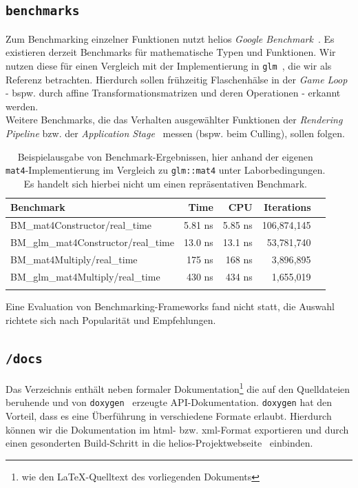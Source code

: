 \subsection*{\texttt{benchmarks}}
\noindent
Zum Benchmarking einzelner Funktionen nutzt helios \textit{Google Benchmark}~\cite[]{googlebenchmarkgithub}.
Es existieren derzeit Benchmarks für mathematische Typen und Funktionen.
Wir nutzen diese für einen Vergleich mit der Implementierung in \texttt{glm}~\cite[]{glmGithub}, die wir als Referenz betrachten.
Hierdurch sollen frühzeitig Flaschenhälse in der \textit{Game Loop} - bspw.  durch affine Transformationsmatrizen und deren Operationen - erkannt werden.\\
Weitere Benchmarks, die das Verhalten ausgewählter Funktionen der \textit{Rendering Pipeline} bzw. der \textit{Application Stage}~\cite[687]{Gre19} messen (bspw. beim Culling), sollen folgen.
\begin{table}[h!]
    \centering
    \begin{tabular}{lrrrr}
        \hline
        \textbf{Benchmark} & \textbf{Time} & \textbf{CPU} & \textbf{Iterations} \\
        \hline
        BM\_mat4Constructor/real\_time         & 5.81 ns  & 5.85 ns  & 106{,}874{,}145 \\
        BM\_glm\_mat4Constructor/real\_time    & 13.0 ns  & 13.1 ns  & 53{,}781{,}740 \\
        BM\_mat4Multiply/real\_time            & 175 ns   & 168 ns   & 3{,}896{,}895 \\
        BM\_glm\_mat4Multiply/real\_time       & 430 ns   & 434 ns   & 1{,}655{,}019 \\
        \hline\\
    \end{tabular}
    \label{tab:mat4-benchmark}
    \caption{Beispielausgabe von Benchmark-Ergebnissen, hier anhand der eigenen \texttt{mat4}-Implementierung im Vergleich zu \texttt{glm::mat4} unter Laborbedingungen. Es handelt sich hierbei nicht um einen repräsentativen Benchmark.}
\end{table}

\noindent
Eine Evaluation von Benchmarking-Frameworks fand nicht statt, die Auswahl richtete sich nach Popularität und Empfehlungen.

\subsection*{\texttt{/docs}}
\noindent
Das Verzeichnis enthält neben formaler Dokumentation\footnote{wie den \LaTeX-Quelltext des vorliegenden Dokuments} die auf den Quelldateien beruhende und von \texttt{doxygen}~\cite[]{Doxygen} erzeugte API-Dokumentation.
\texttt{doxygen} hat den Vorteil, dass es eine Überführung in verschiedene Formate erlaubt.
Hierdurch können wir die Dokumentation im html- bzw. xml-Format exportieren und durch einen gesonderten Build-Schritt in die helios-Projektwebseite~\cite[]{helios} einbinden.\\

